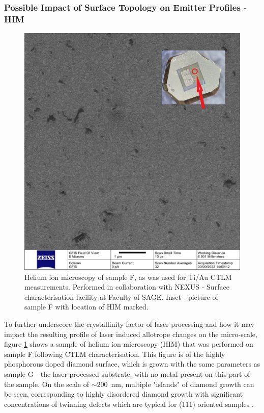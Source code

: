 \begin{refsection}
\subsubsection{Possible Impact of Surface Topology on Emitter Profiles - HIM}
\label{subsubsec:him_emitters}
\begin{figure}[H]
    \centering
    \includegraphics[width=\linewidth]{Chapter7/Figs/Raster/him 002 A.11.jpg}
    \caption{Helium ion microscopy of sample F, as was used for Ti/Au CTLM measurements. Performed in collaboration with NEXUS - Surface characterisation facility at Faculty of SAGE. Inset - picture of sample F with location of HIM marked.}
    \label{fig:him_1}
\end{figure}

To further underscore the crystallinity factor of laser processing and how it may impact the resulting profile of laser induced allotrope changes on the micro-scale, figure \ref{fig:him_1} shows a sample of helium ion microscopy (HIM) that was performed on sample F following CTLM characterisation. This figure is of the highly phosphorous doped diamond surface, which is grown with the same parameters as sample G - the laser processed substrate, with no metal present on this part of the sample. On the scale of $\sim200$~\si{\nano\metre}, multiple "islands" of diamond growth can be seen, corresponding to highly disordered diamond growth with significant concentrations of twinning defects which are typical for \hkl(111) oriented samples \cite{Butler2007, prelas:1997, koizumi1997, koizumi2000, Shechtman1993}. 


\end{refsection}
